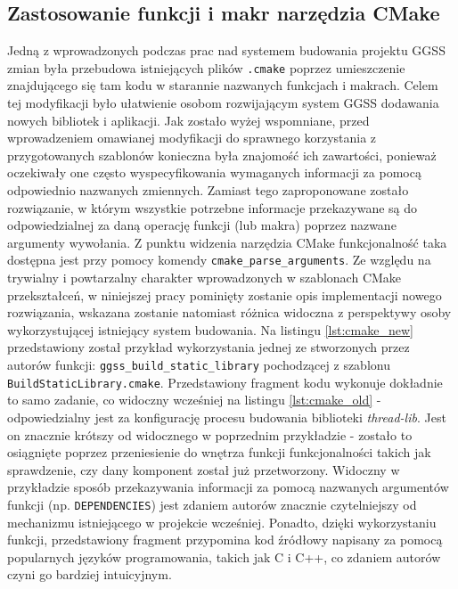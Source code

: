 \subsection{Zastosowanie funkcji i makr narzędzia CMake}
Jedną z wprowadzonych podczas prac nad systemem budowania projektu GGSS zmian była przebudowa istniejących plików \lstinline{.cmake} poprzez umieszczenie znajdującego się tam kodu w starannie nazwanych funkcjach i makrach. Celem tej modyfikacji było ułatwienie osobom rozwijającym system GGSS dodawania nowych bibliotek i aplikacji. Jak zostało wyżej wspomniane, przed wprowadzeniem omawianej modyfikacji do sprawnego korzystania z przygotowanych szablonów konieczna była znajomość ich zawartości, ponieważ oczekiwały one często wyspecyfikowania wymaganych informacji za pomocą odpowiednio nazwanych zmiennych. Zamiast tego zaproponowane zostało rozwiązanie, w którym wszystkie potrzebne informacje przekazywane są do odpowiedzialnej za daną operację funkcji (lub makra) poprzez nazwane argumenty wywołania. Z punktu widzenia narzędzia CMake funkcjonalność taka dostępna jest przy pomocy komendy \lstinline{cmake_parse_arguments}. Ze względu na trywialny i powtarzalny charakter wprowadzonych w szablonach CMake przekształceń, w niniejszej pracy pominięty zostanie opis implementacji nowego rozwiązania, wskazana zostanie natomiast różnica widoczna z perspektywy osoby wykorzystującej istniejący system budowania. Na listingu \ref{lst:cmake_new} przedstawiony został przykład wykorzystania jednej ze stworzonych przez autorów funkcji: \lstinline{ggss_build_static_library} pochodzącej z szablonu \lstinline{BuildStaticLibrary.cmake}. Przedstawiony fragment kodu wykonuje dokładnie to samo zadanie, co widoczny wcześniej na listingu \ref{lst:cmake_old} - odpowiedzialny jest za konfigurację procesu budowania biblioteki \emph{thread-lib}. Jest on znacznie krótszy od widocznego w poprzednim przykładzie - zostało to osiągnięte poprzez przeniesienie do wnętrza funkcji funkcjonalności takich jak sprawdzenie, czy dany komponent został już przetworzony. Widoczny w przykładzie sposób przekazywania informacji za pomocą nazwanych argumentów funkcji (np. \lstinline{DEPENDENCIES}) jest zdaniem autorów znacznie czytelniejszy od mechanizmu istniejącego w projekcie wcześniej. Ponadto, dzięki wykorzystaniu funkcji, przedstawiony fragment przypomina kod źródłowy napisany za pomocą popularnych języków programowania, takich jak C i C++, co zdaniem autorów czyni go bardziej intuicyjnym.



